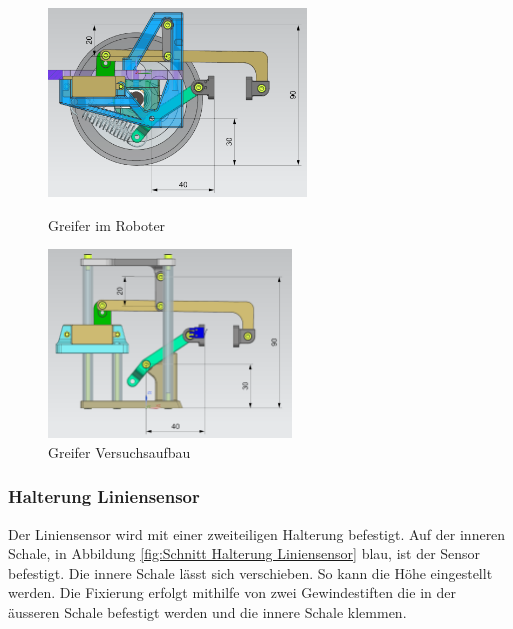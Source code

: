 \begin{figure}[H]
  \centering
  \begin{minipage}[b]{0.45\textwidth}
    \centering
    \includegraphics[height=5cm]{assets/MT/Greifer Montiert.png}
    \caption{Greifer im Roboter}
    \label{fig:Greifer im Roboter}
  \end{minipage}
  \hfill
  \begin{minipage}[b]{0.45\textwidth}
    \centering
    \includegraphics[height=5cm]{assets/MT/Greifer Prototyp.png}
    \caption{Greifer Versuchsaufbau}
    \label{fig:Greifer Versuchsaufbau}
  \end{minipage}
\end{figure}

\newpage

\subsubsection{Halterung Liniensensor}
\label{Halterung Liniensensor}

Der Liniensensor wird mit einer zweiteiligen Halterung befestigt. Auf der inneren Schale, in Abbildung \ref{fig:Schnitt Halterung Liniensensor} blau, ist der Sensor befestigt. Die innere Schale lässt sich verschieben. So kann die Höhe eingestellt werden. Die Fixierung erfolgt mithilfe von zwei Gewindestiften die in der äusseren Schale befestigt werden und die innere Schale klemmen. 


